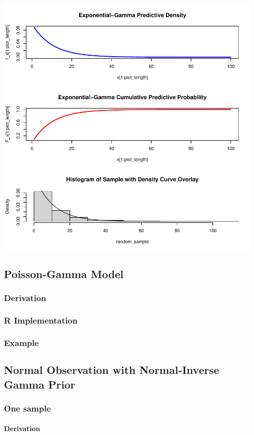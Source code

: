 \documentclass[12pt, a4paper]{article}
\begin{document}
\includegraphics{Thesis_Outline-003}

  \subsection{Poisson-Gamma Model}
    \subsubsection{Derivation}
    \subsubsection{R Implementation}
    \subsubsection{Example}

  \subsection{Normal Observation with Normal-Inverse Gamma Prior}
    \subsubsection{One sample}
      \paragraph{Derivation}
\end{document}
